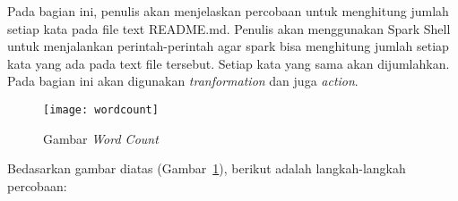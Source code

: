Pada bagian ini, penulis akan menjelaskan percobaan untuk menghitung jumlah setiap kata pada file text README.md. Penulis akan menggunakan Spark Shell untuk menjalankan perintah-perintah agar spark bisa menghitung jumlah setiap kata yang ada pada text file tersebut. Setiap kata yang sama akan dijumlahkan. Pada bagian ini akan digunakan \textit{tranformation} dan juga \textit{action}.

\begin{figure}[H]
    \centering  
    \texttt{[image: wordcount]}  
    \caption[Gambar {\it Word Count} ]{Gambar {\it Word Count}} 
    \label{fig:wordcount} 
\end{figure}

Bedasarkan gambar diatas (Gambar~\ref{fig:wordcount}), berikut adalah langkah-langkah percobaan:

